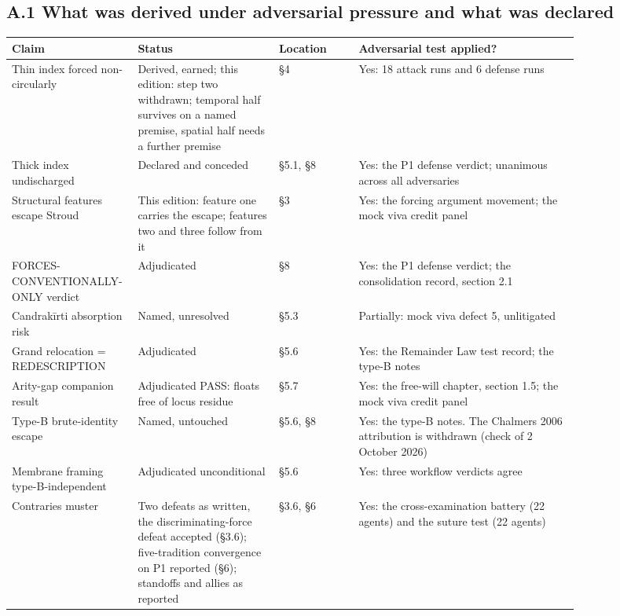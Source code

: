 \documentclass[11pt]{article}
\begin{document}
\subsection*{A.1 What was derived under adversarial pressure and what was declared}

{\small\begin{longtable}{>{\raggedright\arraybackslash}p{0.100\linewidth}>{\raggedright\arraybackslash}p{0.236\linewidth}>{\raggedright\arraybackslash}p{0.135\linewidth}>{\raggedright\arraybackslash}p{0.369\linewidth}}
\toprule
\textbf{Claim} & \textbf{Status} & \textbf{Location} & \textbf{Adversarial test applied?} \\ \midrule\endhead
Thin index forced non-circularly & Derived, earned; this edition: step two withdrawn; temporal half survives on a named premise, spatial half needs a further premise & §4 & Yes: 18 attack runs and 6 defense runs \\
Thick index undischarged & Declared and conceded & §5.1, §8 & Yes: the P1 defense verdict; unanimous across all adversaries \\
Structural features escape Stroud & This edition: feature one carries the escape; features two and three follow from it & §3 & Yes: the forcing argument movement; the mock viva credit panel \\
FORCES-CONVENTIONALLY-ONLY verdict & Adjudicated & §8 & Yes: the P1 defense verdict; the consolidation record, section 2.1 \\
Candrakīrti absorption risk & Named, unresolved & §5.3 & Partially: mock viva defect 5, unlitigated \\
Grand relocation = REDESCRIPTION & Adjudicated & §5.6 & Yes: the Remainder Law test record; the type-B notes \\
Arity-gap companion result & Adjudicated PASS: floats free of locus residue & §5.7 & Yes: the free-will chapter, section 1.5; the mock viva credit panel \\
Type-B brute-identity escape & Named, untouched & §5.6, §8 & Yes: the type-B notes. The Chalmers 2006 attribution is withdrawn (check of 2 October 2026) \\
Membrane framing type-B-independent & Adjudicated unconditional & §5.6 & Yes: three workflow verdicts agree \\
Contraries muster & Two defeats as written, the discriminating-force defeat accepted (§3.6); five-tradition convergence on P1 reported (§6); standoffs and allies as reported & §3.6, §6 & Yes: the cross-examination battery (22 agents) and the suture test (22 agents) \\
\bottomrule\end{longtable}}
\end{document}
